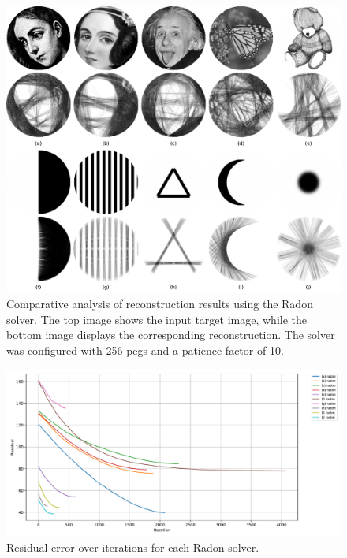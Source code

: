 \begin{figure}[H]
    \centering
    \includegraphics[width=\linewidth]{images/radon/radon_quantitative_test.pdf}
    \caption{Comparative analysis of reconstruction results using the Radon solver. The top image shows the input target image, while the bottom image displays the corresponding reconstruction. The solver was configured with 256 pegs and a patience factor of 10.}
    \label{fig:radon_quantitative}
\end{figure}

\begin{figure}[H]
    \centering
    \includegraphics[width=\linewidth]{images/radon/residual_history.pdf}
    \caption{Residual error over iterations for each Radon solver.}
    \label{fig:radon_norm_error}
\end{figure}

